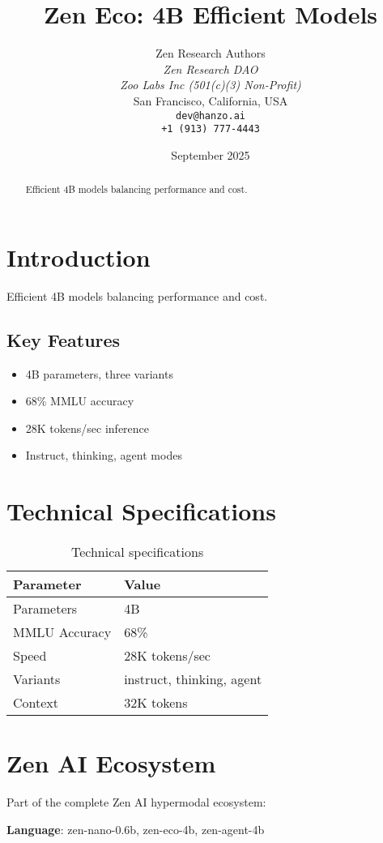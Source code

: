 \documentclass[11pt,a4paper]{article}
\title{Zen Eco: 4B Efficient Models}
\author{
    Zen Research Authors \\
    \textit{Zen Research DAO} \\
    \textit{Zoo Labs Inc (501(c)(3) Non-Profit)} \\
    San Francisco, California, USA \\
    \texttt{dev@hanzo.ai} \\
    \texttt{+1 (913) 777-4443}
}
\date{September 2025}
\begin{document}
\maketitle

\begin{abstract}
Efficient 4B models balancing performance and cost.
\end{abstract}

\section{Introduction}
Efficient 4B models balancing performance and cost.

\subsection{Key Features}
\begin{itemize}
    \item 4B parameters, three variants
    \item 68\% MMLU accuracy
    \item 28K tokens/sec inference
    \item Instruct, thinking, agent modes
\end{itemize}

\section{Technical Specifications}
\begin{table}[h]
\centering
\begin{tabular}{@{}ll@{}}
\toprule
\textbf{Parameter} & \textbf{Value} \\
\midrule
Parameters & 4B \\
MMLU Accuracy & 68\% \\
Speed & 28K tokens/sec \\
Variants & instruct, thinking, agent \\
Context & 32K tokens
\bottomrule
\end{tabular}
\caption{Technical specifications}
\label{tab:specs}
\end{table}

\section{Zen AI Ecosystem}

Part of the complete Zen AI hypermodal ecosystem:

\textbf{Language}: zen-nano-0.6b, zen-eco-4b, zen-agent-4b
\end{document}
